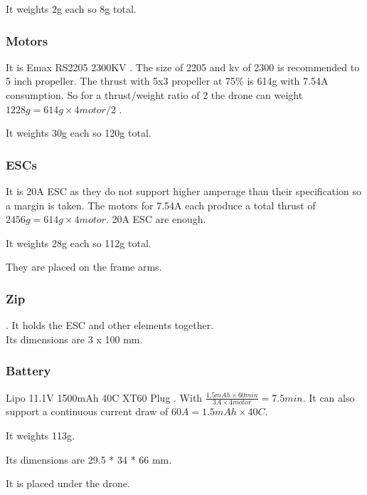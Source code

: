                 It weights 2g each so 8g total.
                
            \subsubsection{Motors}
                It is Emax RS2205 2300KV \cite{bangood_motor}. The size of 2205 and kv of 2300 is recommended to 5 inch propeller. The thrust with 5x3 propeller at 75\% is 614g with 7.54A consumption. So for a thrust/weight ratio of 2 the drone can weight $1228g=614g \times 4motor / 2$ \cite{google_sheets_motor}.
                
                It weights 30g each so 120g total.
                
            \subsubsection{ESCs}
                It is 20A ESC \cite{bangood_esc} as they do not support higher amperage than their specification so a margin is taken. The motors for 7.54A each produce a total thrust of $2456g=614g\times 4motor$. 20A ESC are enough.
                
                It weights 28g each so 112g total.
                
                They are placed on the frame arms.
                
            \subsubsection{Zip}
                \cite{bangood_zip_ties}. It holds the ESC and other elements together.\\
                Its dimensions are 3 x 100 mm.
                
            \subsubsection{Battery}
                Lipo 11.1V 1500mAh 40C XT60 Plug \cite{bangood_battery}. With $ \frac{1.5mAh \times 60min}{3A \times 4motor}= 7.5min$. It can also support a continuous current draw of $60A = 1.5mAh\times 40C$.
                
                It weights 113g.
                
                Its dimensions are 29.5 * 34 * 66 mm.
                
                It is placed under the drone.
                
